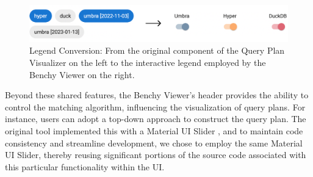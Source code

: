 \begin{figure}[h]
  \centering
  \vspace{0.5cm}
  \includegraphics[width=0.8\linewidth]{figures/legend-conversion.png}
  \caption{Legend Conversion: From the original component of the Query Plan Visualizer \parencite*{semantic-diff} on the left to the interactive legend employed by the Benchy Viewer on the right.}
  \vspace{0.5cm}
  \label{fig:legend-conversion}
\end{figure}

Beyond these shared features, the Benchy Viewer's header provides the ability to control the matching algorithm, influencing the visualization of query plans. For instance, users can adopt a top-down approach to construct the query plan. The original tool implemented this with a Material UI Slider \parencite{mui-slider}, and to maintain code consistency and streamline development, we chose to employ the same Material UI Slider, thereby reusing significant portions of the source code associated with this particular functionality within the UI.

